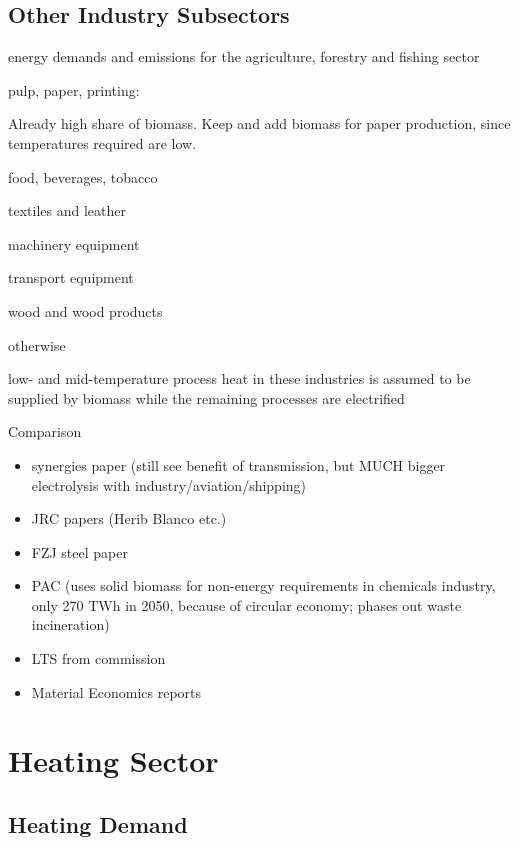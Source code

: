\subsection{Other Industry Subsectors}

energy demands and \co emissions for the agriculture, forestry and fishing
sector

pulp, paper, printing:

Already high share of biomass. Keep and add biomass for paper production, since
temperatures required are low.

food, beverages, tobacco 

textiles and leather

machinery equipment


transport equipment

wood and wood products

otherwise

low- and mid-temperature process heat in these industries is assumed to be supplied by biomass
while the remaining processes are electrified

Comparison

\begin{itemize}
    \item synergies paper (still see benefit of transmission, but MUCH bigger electrolysis with industry/aviation/shipping) 
    \item JRC papers (Herib Blanco etc.) 
    \item FZJ steel paper
    \item PAC (uses solid biomass for non-energy requirements in chemicals industry, only 270 TWh in 2050, because of circular economy; phases out waste incineration) 
    \item LTS from commission 
    \item Material Economics reports 
\end{itemize}

\section{Heating Sector}

\subsection{Heating Demand}

